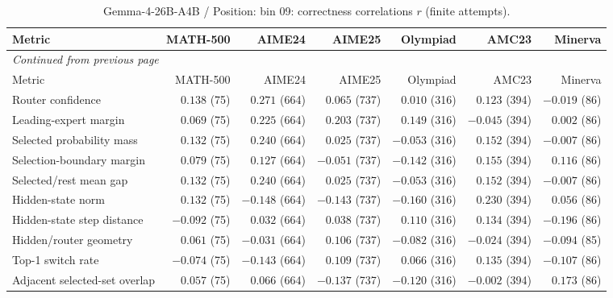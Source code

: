 \begingroup\scriptsize\setlength{\tabcolsep}{4pt}
\begin{longtable}{@{}lrrrrrr@{}}
\caption{Gemma-4-26B-A4B / Position: bin 09: correctness correlations $r$ (finite attempts).}\label{tab:multi-gemma-position-bin_09}\\
\toprule
Metric & MATH-500 & AIME24 & AIME25 & Olympiad & AMC23 & Minerva \\
\midrule\endfirsthead
\multicolumn{7}{l}{\textit{Continued from previous page}}\\
\toprule
Metric & MATH-500 & AIME24 & AIME25 & Olympiad & AMC23 & Minerva \\
\midrule\endhead
\bottomrule\endfoot
Router confidence & $0.138$ (75) & $0.271$ (664) & $0.065$ (737) & $0.010$ (316) & $0.123$ (394) & $-0.019$ (86) \\
Leading-expert margin & $0.069$ (75) & $0.225$ (664) & $0.203$ (737) & $0.149$ (316) & $-0.045$ (394) & $0.002$ (86) \\
Selected probability mass & $0.132$ (75) & $0.240$ (664) & $0.025$ (737) & $-0.053$ (316) & $0.152$ (394) & $-0.007$ (86) \\
Selection-boundary margin & $0.079$ (75) & $0.127$ (664) & $-0.051$ (737) & $-0.142$ (316) & $0.155$ (394) & $0.116$ (86) \\
Selected/rest mean gap & $0.132$ (75) & $0.240$ (664) & $0.025$ (737) & $-0.053$ (316) & $0.152$ (394) & $-0.007$ (86) \\
Hidden-state norm & $0.132$ (75) & $-0.148$ (664) & $-0.143$ (737) & $-0.160$ (316) & $0.230$ (394) & $0.056$ (86) \\
Hidden-state step distance & $-0.092$ (75) & $0.032$ (664) & $0.038$ (737) & $0.110$ (316) & $0.134$ (394) & $-0.196$ (86) \\
Hidden/router geometry & $0.061$ (75) & $-0.031$ (664) & $0.106$ (737) & $-0.082$ (316) & $-0.024$ (394) & $-0.094$ (85) \\
Top-1 switch rate & $-0.074$ (75) & $-0.143$ (664) & $0.109$ (737) & $0.066$ (316) & $0.135$ (394) & $-0.107$ (86) \\
Adjacent selected-set overlap & $0.057$ (75) & $0.066$ (664) & $-0.137$ (737) & $-0.120$ (316) & $-0.002$ (394) & $0.173$ (86) \\
\end{longtable}\endgroup

